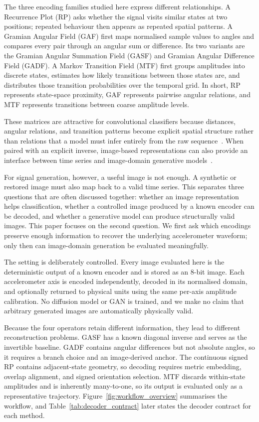 \documentclass[5p]{elsarticle}
\begin{document}
The three encoding families studied here express different relationships. A Recurrence Plot (RP) asks whether the signal visits similar states at two positions; repeated behaviour then appears as repeated spatial patterns. A Gramian Angular Field (GAF) first maps normalised sample values to angles and compares every pair through an angular sum or difference. Its two variants are the Gramian Angular Summation Field (GASF) and Gramian Angular Difference Field (GADF). A Markov Transition Field (MTF) first groups amplitudes into discrete states, estimates how likely transitions between those states are, and distributes those transition probabilities over the temporal grid. In short, RP represents state-space proximity, GAF represents pairwise angular relations, and MTF represents transitions between coarse amplitude levels.

These matrices are attractive for convolutional classifiers because distances, angular relations, and transition patterns become explicit spatial structure rather than relations that a model must infer entirely from the raw sequence~\cite{wang2015encoding,wang2015encoding2}. When paired with an explicit inverse, image-based representations can also provide an interface between time series and image-domain generative models~\cite{huang2023tsdigan,hellermann2026imagegan}.

For signal generation, however, a useful image is not enough. A synthetic or restored image must also map back to a valid time series. This separates three questions that are often discussed together: whether an image representation helps classification, whether a controlled image produced by a known encoder can be decoded, and whether a generative model can produce structurally valid images. This paper focuses on the second question. We first ask which encodings preserve enough information to recover the underlying accelerometer waveform; only then can image-domain generation be evaluated meaningfully.

The setting is deliberately controlled. Every image evaluated here is the deterministic output of a known encoder and is stored as an 8-bit image. Each accelerometer axis is encoded independently, decoded in its normalised domain, and optionally returned to physical units using the same per-axis amplitude calibration. No diffusion model or GAN is trained, and we make no claim that arbitrary generated images are automatically physically valid.

Because the four operators retain different information, they lead to different reconstruction problems. GASF has a known diagonal inverse and serves as the invertible baseline. GADF contains angular differences but not absolute angles, so it requires a branch choice and an image-derived anchor. The continuous signed RP contains adjacent-state geometry, so decoding requires metric embedding, overlap alignment, and signed orientation selection. MTF discards within-state amplitudes and is inherently many-to-one, so its output is evaluated only as a representative trajectory. Figure~\ref{fig:workflow_overview} summarises the workflow, and Table~\ref{tab:decoder_contract} later states the decoder contract for each method.
\end{document}
